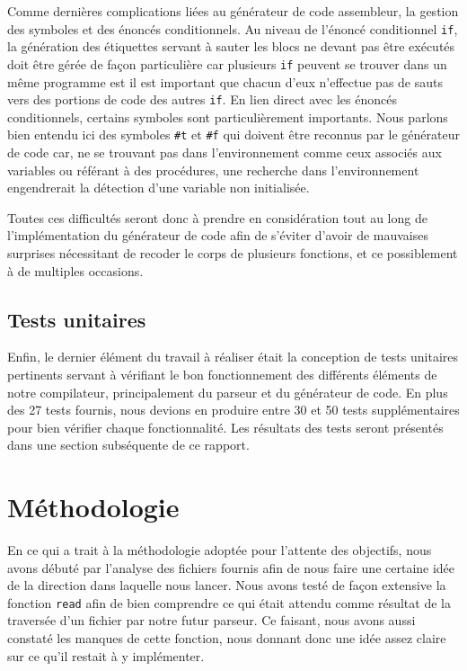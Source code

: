 \documentclass[12pt]{article}
\begin{document}
Comme dernières complications liées au générateur de code assembleur, la gestion des symboles et des énoncés conditionnels. Au niveau de l'énoncé conditionnel \texttt{if}, la génération des étiquettes servant à sauter les blocs ne devant pas être exécutés doit être gérée de façon particulière car plusieurs \texttt{if} peuvent se trouver dans un même programme est il est important que chacun d'eux n'effectue pas de sauts vers des portions de code des autres \texttt{if}. En lien direct avec les énoncés conditionnels, certains symboles sont particulièrement importants. Nous parlons bien entendu ici des symboles \texttt{\#t} et \texttt{\#f} qui doivent être reconnus par le générateur de code car, ne se trouvant pas dans l'environnement comme ceux associés aux variables ou référant à des procédures, une recherche dans l'environnement engendrerait la détection d'une variable non initialisée.

Toutes ces difficultés seront donc à prendre en considération tout au long de l'implémentation du générateur de code afin de s'éviter d'avoir de mauvaises surprises nécessitant de recoder le corps de plusieurs fonctions, et ce possiblement à de multiples occasions.

\subsection{Tests unitaires}
Enfin, le dernier élément du travail à réaliser était la conception de tests unitaires pertinents servant à vérifiant le bon fonctionnement des différents éléments de notre compilateur, principalement du parseur et du générateur de code. En plus des 27 tests fournis, nous devions en produire entre 30 et 50 tests supplémentaires pour bien vérifier chaque fonctionnalité. Les résultats des tests seront présentés dans une section subséquente de ce rapport.


\section{Méthodologie}
En ce qui a trait à la méthodologie adoptée pour l'attente des objectifs, nous avons débuté par l'analyse des fichiers fournis afin de nous faire une certaine idée de la direction dans laquelle nous lancer. Nous avons testé de façon extensive la fonction \texttt{read} afin de bien comprendre ce qui était attendu comme résultat de la traversée d'un fichier par notre futur parseur. Ce faisant, nous avons aussi constaté les manques de cette fonction, nous donnant donc une idée assez claire sur ce qu'il restait à y implémenter.
\end{document}
